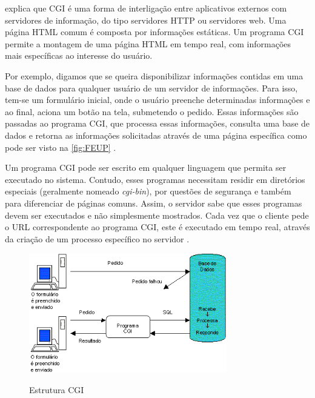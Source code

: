  explica que CGI é uma forma de interligação entre aplicativos externos com servidores de informação, do tipo servidores HTTP ou servidores web. Uma página HTML comum é composta por informações estáticas. Um programa CGI permite a montagem de uma página HTML em tempo real, com informações mais específicas ao interesse do usuário.

Por exemplo, digamos que se queira disponibilizar informações contidas em uma base de dados para qualquer usuário de um servidor de informações. Para isso, tem-se um formulário inicial, onde o usuário preenche determinadas informações e ao final, aciona um botão na tela, submetendo o pedido. Essas informações são passadas ao programa CGI, que processa essas informações, consulta uma base de dados e retorna as informações solicitadas através de uma página específica como pode ser visto na \autoref{fig:FEUP} \cite{apache:corte}.


Um programa CGI pode ser escrito em qualquer linguagem que permita ser executado no sistema. Contudo, esses programas necessitam residir em diretórios especiais (geralmente nomeado \textit{cgi-bin}), por questões de segurança e também para diferenciar de páginas comuns. Assim, o servidor sabe que esses programas devem ser executados e não simplesmente mostrados. Cada vez que o cliente pede o URL correspondente ao programa CGI, este é executado em tempo real, através da criação de um processo específico no servidor \cite{apache:corte}.

\begin{figure}[H]
    \centering
    \caption{Estrutura CGI}
    \includegraphics[width=0.77\textwidth]{./dados/figuras/fig11}
    \label{fig:FEUP}
\end{figure}